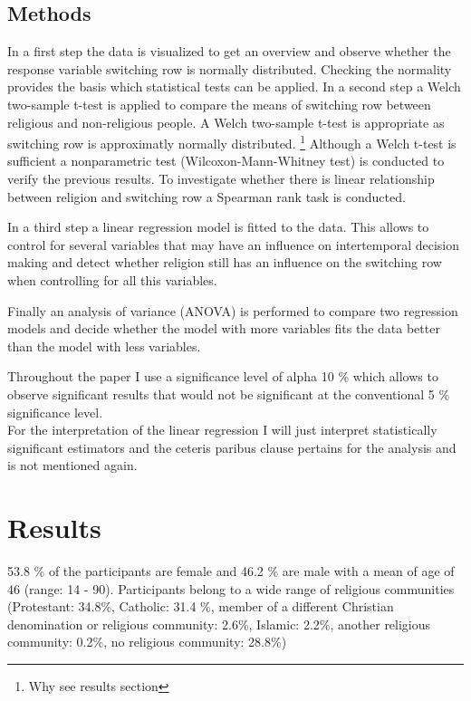 \documentclass[12pt,a4paper]{article}
\begin{document}

\subsection{Methods}
In a first step the data is visualized to get an overview and observe whether the response variable switching row is normally distributed. Checking the normality provides the basis which statistical tests can be applied. 
In a second step a Welch two-sample t-test is applied to compare the means of switching row between religious and non-religious people. A Welch two-sample t-test is appropriate as switching row is approximatly normally distributed. \footnote{Why see results section} Although a Welch t-test is sufficient a nonparametric test (Wilcoxon-Mann-Whitney test) is conducted to verify the previous results.
To investigate whether there is linear relationship between religion and switching row a Spearman rank task is conducted. 
 
In a third step a linear regression model is fitted to the data. This allows to control for several variables that may have an influence on intertemporal decision making and detect whether religion still has an influence on the switching row when controlling for all this variables.


Finally an analysis of variance (ANOVA) is performed to compare two regression models and decide whether the  model with more variables fits the data better than the model with less variables. 


Throughout the paper I use a significance level of alpha 10 \% which allows to observe significant results that would not be significant at the conventional 5 \% significance level.\\
For the interpretation of the linear regression I will just interpret statistically significant estimators and the ceteris paribus clause pertains for the analysis and is not mentioned again.
\section{Results}
53.8 \% of the participants are female and 46.2 \% are male with a mean of age of 46 (range: 14 - 90).  
Participants belong to a wide range of religious communities (Protestant: 34.8\%, Catholic: 31.4 \%, member of a different Christian denomination or religious community: 2.6\%, Islamic: 2.2\%, another religious community: 0.2\%, no religious community: 28.8\%) 
 
\end{document}
